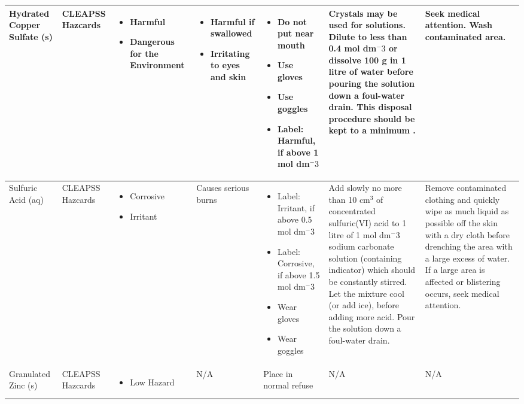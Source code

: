 \begin{landscape}
\begin{center}
\begin{longtable}{|p{1.5cm}|p{1.5cm}|p{3cm}|p{3cm}|p{3cm}|p{3cm}|p{2cm}|}
Hydrated Copper Sulfate (s) &
CLEAPSS Hazcards &
\begin{itemize}
\item Harmful
\item Dangerous for the Environment \end{itemize} &
\begin{itemize}
\item Harmful if swallowed
\item Irritating to eyes and skin \end{itemize} &
\begin{itemize}
\item Do not put near mouth
\item Use gloves
\item Use goggles
\item Label: Harmful, if above 1 mol dm$^-3$ \end{itemize} &
Crystals may be used for solutions. Dilute to less than 0.4 mol dm$^-3$ or dissolve 100 g in 1 litre of water before pouring the solution down a foul-water drain. This disposal procedure should be kept to a minimum . &
Seek medical attention. Wash contaminated area. \\ \hline



Sulfuric Acid (aq) &
CLEAPSS Hazcards &
\begin{itemize}
\item Corrosive
\item Irritant \end{itemize} &
Causes serious burns & 
\begin{itemize}
\item Label: Irritant, if above 0.5 mol dm$^-3$
\item Label: Corrosive, if above 1.5 mol dm$^-3$
\item Wear gloves
\item Wear goggles \end{itemize} &
Add slowly no more than 10 cm$^3$ of concentrated sulfuric(VI) acid to 1 litre of 1 mol dm$^-3$ sodium carbonate solution (containing indicator) which should be constantly stirred. Let the mixture cool (or add ice), before adding more acid. Pour the solution down a foul-water drain. & 
Remove contaminated clothing and quickly wipe as much liquid as possible off the skin with a dry cloth before drenching the area with a large excess of water. If a large area is affected or blistering occurs, seek medical attention. \\ \hline

Granulated Zinc (s) &
CLEAPSS Hazcards &
\begin{itemize}
\item Low Hazard \end{itemize} &
N/A &
Place in normal refuse &
N/A &
N/A \\ \hline

\end{longtable}
\label{tab:Risk Assessment Table}

\end{center}


\end{landscape}



